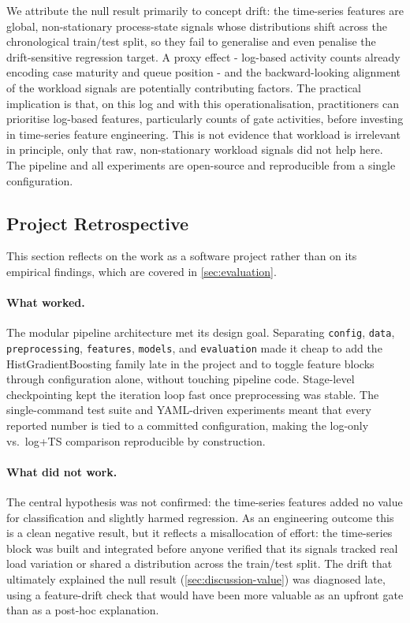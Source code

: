 \documentclass[runningheads]{llncs}
\begin{document}
We attribute the null result primarily to concept drift: the time-series
features are global, non-stationary process-state signals whose distributions
shift across the chronological train/test split, so they fail to generalise and
even penalise the drift-sensitive regression target. A proxy effect -
log-based activity counts already encoding case maturity and queue position -
and the backward-looking alignment of the workload signals are potentially contributing
factors. The practical implication is that, on this log and with this
operationalisation, practitioners can prioritise log-based features,
particularly counts of gate activities, before investing in time-series feature
engineering. This is not evidence that workload is irrelevant in principle, only
that raw, non-stationary workload signals did not help here. The pipeline and
all experiments are open-source and reproducible from a single configuration.

\subsection{Project Retrospective}
\label{sec:retrospective}

This section reflects on the work as a software project rather than on its
empirical findings, which are covered in \autoref{sec:evaluation}.

\paragraph{What worked.}
The modular pipeline architecture met its design goal. Separating
\texttt{config}, \texttt{data}, \texttt{preprocessing}, \texttt{features},
\texttt{models}, and \texttt{evaluation} made it cheap to add the
HistGradientBoosting family late in the project and to toggle feature blocks
through configuration alone, without touching pipeline code. Stage-level
checkpointing kept the iteration loop fast once preprocessing was stable. The
single-command test suite and YAML-driven experiments meant that every reported
number is tied to a committed configuration, making the log-only vs.\ log+TS
comparison reproducible by construction.

\paragraph{What did not work.}
The central hypothesis was not confirmed: the time-series features added no
value for classification and slightly harmed regression. As an engineering
outcome this is a clean negative result, but it reflects a misallocation of
effort: the time-series block was built and integrated before anyone verified
that its signals tracked real load variation or shared a distribution across the
train/test split. The drift that ultimately explained the null result
(\autoref{sec:discussion-value}) was diagnosed late, using a feature-drift check
that would have been more valuable as an upfront gate than as a post-hoc
explanation.
\end{document}
